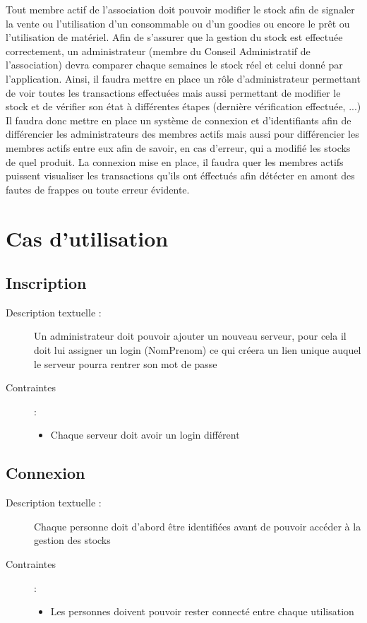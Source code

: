 \documentclass{article}
\begin{document}
  Tout membre actif de l’association doit pouvoir modifier le stock afin de signaler la vente ou l’utilisation d’un consommable ou d’un goodies ou encore le prêt ou l’utilisation de matériel. \newline
  Afin de s’assurer que la gestion du stock est effectuée correctement, un administrateur (membre du Conseil Administratif de l'association) devra comparer chaque semaines le stock réel et celui donné par l’application. \newline
  Ainsi, il faudra mettre en place un rôle d’administrateur permettant de voir toutes les transactions effectuées mais aussi permettant de modifier le stock et de vérifier son état à différentes étapes (dernière vérification effectuée, ...) \newline
  Il faudra donc mettre en place un système de connexion et d’identifiants afin de différencier les administrateurs des membres actifs mais aussi pour différencier les membres actifs entre eux afin de savoir, en cas d'erreur, qui a modifié les stocks de quel produit. \newline
  La connexion mise en place, il faudra quer les membres actifs puissent visualiser les transactions qu'ils ont éffectués afin détécter en amont des fautes de frappes ou toute erreur évidente.

\section{Cas d'utilisation }
  \subsection{Inscription}
    \begin{description}
      \item[Description textuelle :] Un administrateur doit pouvoir ajouter un nouveau serveur, pour cela il doit lui assigner un login (NomPrenom) ce qui créera un lien unique auquel le serveur pourra rentrer son mot de passe
      \item[Contraintes ]:  
        \begin{itemize}
          \item Chaque serveur doit avoir un login différent
        \end{itemize}
    \end{description}
  \subsection{Connexion}
    \begin{description}
      \item[Description textuelle :] Chaque personne doit d'abord être identifiées avant de pouvoir accéder à la gestion des stocks
      \item[Contraintes ]:  
        \begin{itemize}
          \item Les personnes doivent pouvoir rester connecté entre chaque utilisation
        \end{itemize}
    \end{description}
\end{document}

